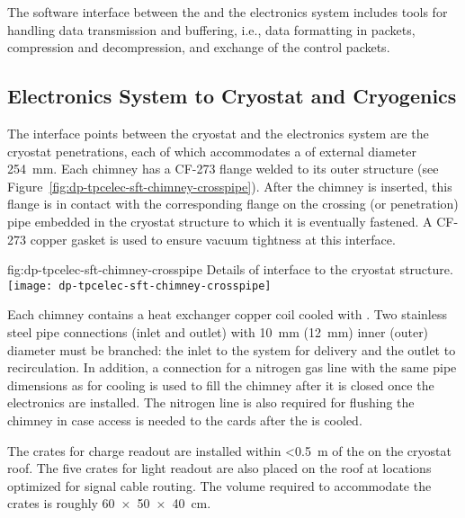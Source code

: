 The software interface between the  and the electronics system includes tools for handling data transmission and buffering, i.e.,  data formatting in  packets, compression and decompression, and exchange of the control packets.

\subsection{Electronics System to Cryostat and Cryogenics}
\label{ssec:dp-tpcelec-intfc-cryo}

The interface points between the cryostat and the  electronics system %
are the cryostat penetrations, each of which %
accommodates a %
 of external diameter \SI{254}{\mm}. Each chimney has a CF-273 flange welded to its outer structure (see Figure~\ref{fig:dp-tpcelec-sft-chimney-crosspipe}). After the chimney is inserted, this flange is in contact with the corresponding flange on the crossing (or penetration) pipe embedded in the cryostat structure to which it is eventually fastened. %
A CF-273 copper gasket is used to ensure vacuum tightness at this interface.  

\begin{dunefigure}{fig:dp-tpcelec-sft-chimney-crosspipe}
{Details of  interface to the cryostat structure.}
\texttt{[image: dp-tpcelec-sft-chimney-crosspipe]}
\end{dunefigure}

Each chimney contains a heat exchanger copper coil cooled with . Two stainless steel pipe connections (inlet and outlet) with \SI{10}{\mm} (\SI{12}{\mm}) inner (outer) diameter must be branched: the inlet to the system for  delivery and the outlet to recirculation. In addition, a connection for a nitrogen gas line with the same pipe dimensions as for  cooling is used to fill the chimney after it is closed once the  electronics are installed. The nitrogen line is also required for flushing the chimney in case access is needed to the  cards after the  is cooled. %

The  crates for charge readout are installed within \SI{<0.5}{\meter} of the  on %
the cryostat roof. The five  crates for light readout are also placed on the roof %
at %
locations optimized for %
 signal cable routing. The volume required  to accommodate the crates is roughly \SI[product-units=power]{60x50x40}{\cm}. 

